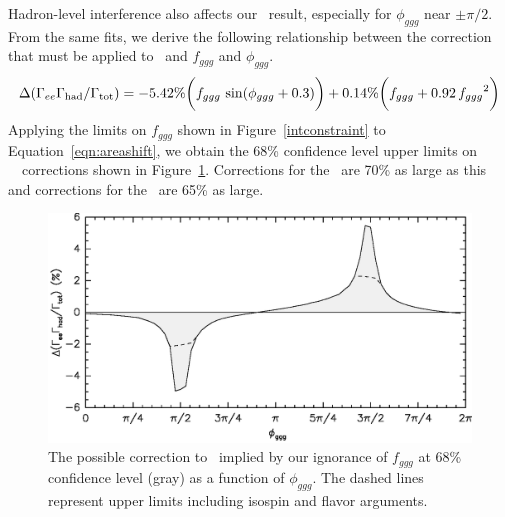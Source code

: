\documentclass{cornell}
\begin{document}
Hadron-level interference also affects our \geehadtot\ result,
especially for $\phi_{ggg}$ near $\pm \pi/2$.  From the same fits, we
derive the following relationship between the correction that must be
applied to \geehadtot\ and $f_{ggg}$ and $\phi_{ggg}$.
\begin{equation}
  \Delta(\Gamma_{ee}\Gamma_{\mbox{\scriptsize had}}/\Gamma_{\mbox{\scriptsize tot}}) = -5.42\%
  \bigg(f_{ggg} \, \sin(\phi_{ggg} + 0.3) \bigg)
  + 0.14\% \bigg(f_{ggg} + 0.92 \, {f_{ggg}}^2 \bigg)
  \label{eqn:areashift}
\end{equation}
Applying the limits on $f_{ggg}$ shown in Figure~\ref{intconstraint}
to Equation~\ref{eqn:areashift}, we obtain the 68\% confidence level
upper limits on \us\ \geehadtot\ corrections shown in
Figure~\ref{areaconstraint}.  Corrections for the \uss\ are 70\% as
large as this and corrections for the \usss\ are 65\% as large.

\begin{figure}[p]
  \begin{center}
    \includegraphics[width=0.8\linewidth]{areaconstraint}
  \end{center}
  \caption[Upper limits on \gee\ corrections due
  Strong/Electromagnetic interference]{\label{areaconstraint} The
  possible correction to \geehadtot\ implied by our ignorance of
  $f_{ggg}$ at 68\% confidence level (gray) as a function of
  $\phi_{ggg}$.  The dashed lines represent upper limits including
  isospin and flavor arguments.}
\end{figure}
\end{document}
